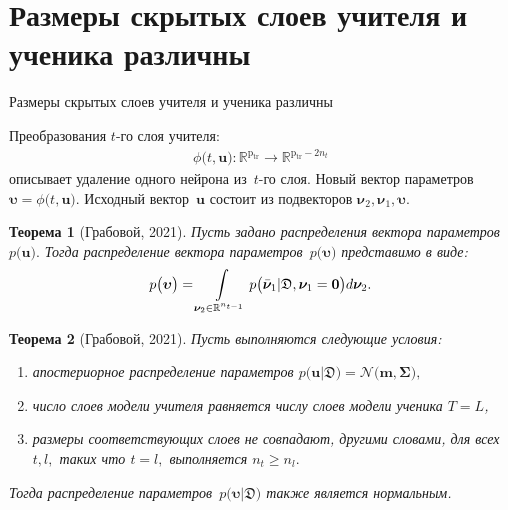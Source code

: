 \documentclass[10pt,pdf,hyperref={unicode}]{beamer}
\newtheorem{rustheorem}{Теорема}
\begin{document}
\section{Размеры скрытых слоев учителя и ученика различны}
\begin{frame}{Размеры скрытых слоев учителя и ученика различны}

Преобразования $t$-го слоя учителя:
\[
\begin{aligned}
\phi\bigr(t, \mathbf{u}\bigr) : \mathbb{R}^{\text{p}_{\text{tr}}} \to \mathbb{R}^{\text{p}_{\text{tr}}-2n_t}
\end{aligned}
\]
описывает удаление одного нейрона из~$t$-го слоя. Новый вектор параметров $\bm{\upsilon} =  \phi\bigr(t, \mathbf{u}\bigr).$ Исходный вектор~$\mathbf{u}$ состоит из подвекторов $\bm{\nu}_2, {\bm{\nu}}_1, \bm{\upsilon}.$

\begin{rustheorem}[Грабовой, 2021]
\justifying
Пусть задано распределения вектора параметров~$p\bigr(\mathbf{u}\bigr).$ Тогда распределение вектора параметров~$p\bigr(\bm{\upsilon}\bigr)$ представимо в виде:
\[
\setlength\abovedisplayskip{0pt}
p\bigr(\bm{\upsilon}\bigr)  = \int\limits_{ \bm{\nu}_2 \in \mathbb{R}^{n_{t-1}}}p\bigr(\bar{\bm{\nu}}_1|\mathfrak{D}, \bm{\nu}_1=\mathbf{0}\bigr) d \bm{\nu}_2.
\setlength\belowdisplayskip{0pt}
\]
\end{rustheorem}

\begin{rustheorem}[Грабовой, 2021]
\justifying
Пусть выполняются следующие условия:
\begin{enumerate}[1)]
\item апостериорное распределение параметров $p\bigr(\mathbf{u}|\mathfrak{D}\bigr) = \mathcal{N}\bigr(\mathbf{m}, \bm{\Sigma}\bigr),$
\item число слоев модели учителя равняется числу слоев модели ученика $T=L$,
\item размеры соответствующих слоев не совпадают, другими словами, для всех $t, l,$ таких что $t=l,$ выполняется $n_t \geq n_l.$
\end{enumerate}
Тогда распределение параметров~$p\bigr(\bm{\upsilon}|\mathfrak{D}\bigr)$ также является нормальным.
\end{rustheorem}

\end{frame}
\end{document}
